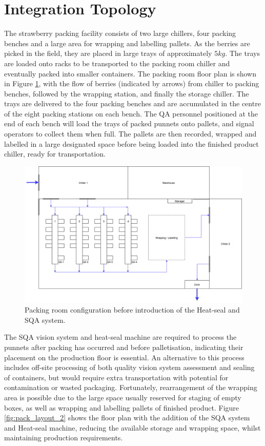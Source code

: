 \documentclass[fleqn,twoside,12pt]{report}
\begin{document}
\section{Integration Topology}
  

The strawberry packing facility consists of two large chillers, four packing benches and a large area for wrapping and labelling pallets. As the berries are picked in the field, they are placed in large trays of approximately $5kg$. The trays are loaded onto racks to be transported to the packing room chiller and eventually packed into smaller containers. The packing room floor plan is shown in Figure \ref{fig:pack_layout_1}, with the flow of berries (indicated by arrows) from chiller to packing benches, followed by the wrapping station, and finally the storage chiller. The trays are delivered to the four packing benches and are accumulated in the centre of the eight packing stations on each bench. The QA personnel positioned at the end of each bench will load the trays of packed punnets onto pallets, and signal operators to collect them when full. The pallets are then recorded, wrapped and labelled in a large designated space before being loaded into the finished product chiller, ready for transportation.


\begin{figure}[h]
	\centering
	\includegraphics[width=.95\linewidth]{Pack_layout_1.png}
	\caption{Packing room configuration before introduction of the Heat-seal and SQA system.}
	\label{fig:pack_layout_1}
\end{figure}%


The SQA vision system and heat-seal machine are required to process the punnets after packing has occurred and before palletisation, indicating their placement on the production floor is essential. An alternative to this process includes off-site processing of both quality vision system assessment and sealing of containers, but would require extra transportation with potential for contamination or wasted packaging. Fortunately, rearrangement of the wrapping area is possible due to the large space usually reserved for staging of empty boxes, as well as wrapping and labelling pallets of finished product. Figure \ref{fig:pack_layout_2} shows the floor plan with the addition of the SQA system and Heat-seal machine, reducing the available storage and wrapping space, whilst maintaining production requirements.
\end{document}
